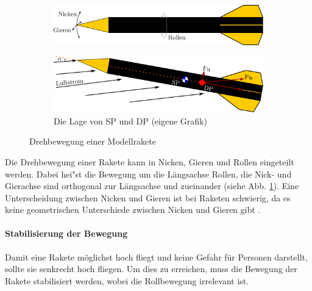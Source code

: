 \documentclass[10pt,a4paper]{article}
\begin{document}
\begin{figure}[h]
\begin{subfigure}[l]{0.49\textwidth}
	\centering
	\includegraphics[width=\textwidth]{Bilder/Freiheitsgrade.png}
	\label{sfig-Freihetsgrade}
\end{subfigure}
\begin{subfigure}[l]{0.49\textwidth}
	\centering
	\includegraphics[width=\textwidth]{Bilder/Lage-DP-SP.png}
	\caption{Die Lage von SP und DP (eigene Grafik)}
	\label{sfig-Lage-DP-SP}
\end{subfigure}
\caption{Drehbewegung einer Modellrakete}
\end{figure}

Die Drehbewegung einer Rakete kann in Nicken, Gieren und Rollen eingeteilt werden. Dabei hei"st die Bewegung um die Längsachse Rollen, die Nick- und Gierachse sind orthogonal zur Längsachse und zueinander (siehe Abb. \ref{sfig-Freihetsgrade}). Eine Unterscheidung zwischen Nicken und Gieren ist bei Raketen schwierig, da es keine geometrischen Unterschiede zwischen Nicken und Gieren gibt \cite{AbR}.

\paragraph{Stabilisierung der Bewegung}
Damit eine Rakete möglichst hoch fliegt und keine Gefahr für Personen darstellt, sollte sie senkrecht hoch fliegen. Um dies zu erreichen, muss die Bewegung der Rakete stabilisiert werden, wobei die Rollbewegung irrelevant ist.
\end{document}
